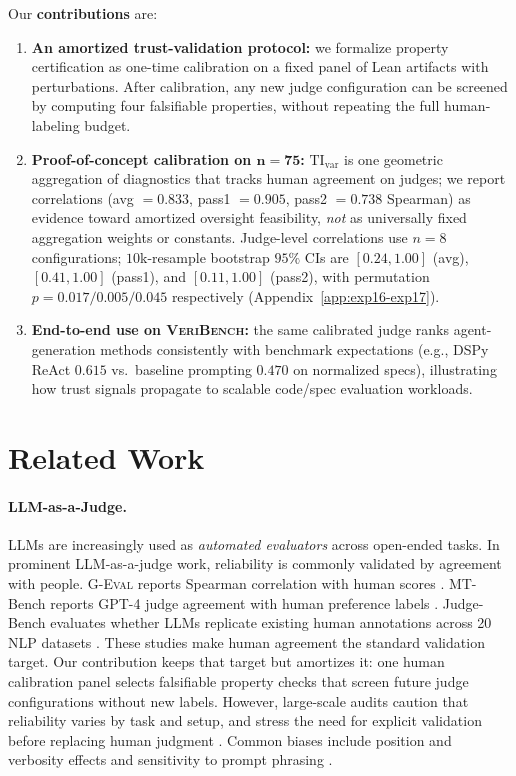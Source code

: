 \documentclass{article}
\begin{document}
Our \textbf{contributions} are:
\begin{enumerate}
  \item \textbf{An amortized trust-validation protocol:} we formalize property certification as one-time calibration on a fixed panel of Lean artifacts with perturbations. After calibration, any new judge configuration can be screened by computing four falsifiable properties, without repeating the full human-labeling budget.

  \item \textbf{Proof-of-concept calibration on \(\bm{n{=}75}\):} \(\mathrm{TI}_{\mathrm{var}}\) is one geometric aggregation of diagnostics that tracks human agreement on judges; we report correlations (avg \(=0.833\), pass1 \(=0.905\), pass2 \(=0.738\) Spearman) as evidence toward amortized oversight feasibility, \emph{not} as universally fixed aggregation weights or constants. Judge-level correlations use \(n{=}8\) configurations; \(10\)k-resample bootstrap \(95\%\) CIs are \([0.24,1.00]\) (avg), \([0.41,1.00]\) (pass1), and \([0.11,1.00]\) (pass2), with permutation \(p=0.017/0.005/0.045\) respectively (Appendix~\ref{app:exp16-exp17}).
  \item \textbf{End-to-end use on \textsc{VeriBench}:} the same calibrated judge ranks agent-generation methods consistently with benchmark expectations (e.g., DSPy ReAct \(0.615\) vs.\ baseline prompting \(0.470\) on normalized specs), illustrating how trust signals propagate to scalable code/spec evaluation workloads.
\end{enumerate}

\section{Related Work}
\paragraph{LLM-as-a-Judge.}
LLMs are increasingly used as \emph{automated evaluators} across open-ended tasks.
In prominent LLM-as-a-judge work, reliability is commonly validated by agreement with people.
\textsc{G-Eval} reports Spearman correlation with human scores \citep{Liu2023GEval}.
MT-Bench reports GPT-4 judge agreement with human preference labels \citep{Zheng2023MTBench}.
Judge-Bench evaluates whether LLMs replicate existing human annotations across 20 NLP datasets \citep{Kocmi2024HumanVsLLM}.
These studies make human agreement the standard validation target.
Our contribution keeps that target but amortizes it: one human calibration panel selects falsifiable property checks that screen future judge configurations without new labels.
However, large-scale audits caution that reliability varies by task and setup, and stress the need for explicit validation before replacing human judgment \citep{Kocmi2024HumanVsLLM,Li2024TrustLLMJudgments}.
Common biases include position and verbosity effects and sensitivity to prompt phrasing \citep{Zheng2023MTBench,Li2024TrustLLMJudgments}.
\end{document}
